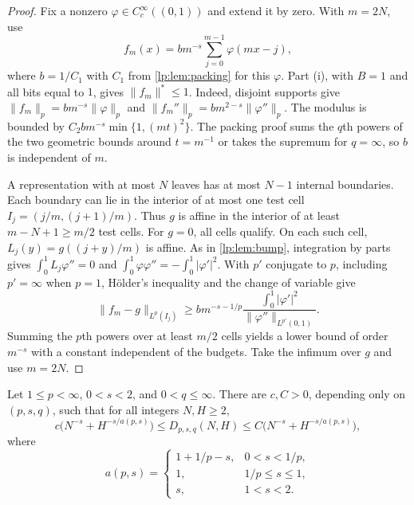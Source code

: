 \documentclass[11pt,a4paper]{article}
\begin{document}
\begin{proof}
Fix a nonzero $\varphi\in C_c^\infty((0,1))$ and extend it by zero. With $m=2N$, use
\[
 f_m(x)=b m^{-s}\sum_{j=0}^{m-1}\varphi(mx-j),
\]
where $b=1/C_1$ with $C_1$ from \cref{lp:lem:packing} for this $\varphi$. Part (i), with $B=1$ and all bits equal to $1$, gives $\|f_m\|^*\le1$. Indeed, disjoint supports give $\|f_m\|_p=b m^{-s}\|\varphi\|_p$ and $\|f_m''\|_p=b m^{2-s}\|\varphi''\|_p$. The modulus is bounded by $C_2 b m^{-s}\min\{1,(mt)^2\}$. The packing proof sums the $q$th powers of the two geometric bounds around $t=m^{-1}$ or takes the supremum for $q=\infty$, so $b$ is independent of $m$.

A representation with at most $N$ leaves has at most $N-1$ internal boundaries. Each boundary can lie in the interior of at most one test cell $I_j=(j/m,(j+1)/m)$. Thus $g$ is affine in the interior of at least $m-N+1\ge m/2$ test cells. For $g=0$, all cells qualify. On each such cell, $L_j(y)=g((j+y)/m)$ is affine. As in \cref{lp:lem:bump}, integration by parts gives $\int_0^1 L_j\varphi''=0$ and $\int_0^1\varphi\varphi''=-\int_0^1|\varphi'|^2$. With $p'$ conjugate to $p$, including $p'=\infty$ when $p=1$, Hölder's inequality and the change of variable give
\[
 \|f_m-g\|_{L^p(I_j)}
 \ge b m^{-s-1/p}\frac{\int_0^1|\varphi'|^2}{\|\varphi''\|_{L^{p'}(0,1)}} .
\]
Summing the $p$th powers over at least $m/2$ cells yields a lower bound of order $m^{-s}$ with a constant independent of the budgets. Take the infimum over $g$ and use $m=2N$.
\end{proof}

\begin{teorema}
\label{lp:thm:minimax-nh}
Let $1\le p<\infty$, $0<s<2$, and $0<q\le\infty$. There are $c,C>0$, depending only on $(p,s,q)$, such that for all integers $N,H\ge2$,
\begin{equation}
 c\bigl(N^{-s}+H^{-s/a(p,s)}\bigr)
 \le D_{p,s,q}(N,H)\le C\bigl(N^{-s}+H^{-s/a(p,s)}\bigr),
 \label{lp:eq:minimax-nh}
\end{equation}
where
\[
 a(p,s)=
 \begin{cases}
 1+1/p-s,&0<s<1/p,\\
 1,&1/p\le s\le1,\\
 s,&1<s<2.
 \end{cases}
\]
\end{teorema}
\end{document}
